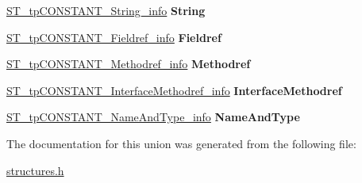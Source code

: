 \begin{DoxyCompactItemize}
\mbox{\label{unionST__tpConstantPool_a624d49bd6a5a4e803ecc39fba2f634e0}} 
\mbox{\hyperlink{structCONSTANT__String__info}{S\+T\+\_\+tp\+C\+O\+N\+S\+T\+A\+N\+T\+\_\+\+String\+\_\+info}} {\bfseries String}
\item 
\mbox{\label{unionST__tpConstantPool_aafaefb9772a16b34e42e568bdef7287a}} 
\mbox{\hyperlink{structST__tpCONSTANT__Fieldref__info}{S\+T\+\_\+tp\+C\+O\+N\+S\+T\+A\+N\+T\+\_\+\+Fieldref\+\_\+info}} {\bfseries Fieldref}
\item 
\mbox{\label{unionST__tpConstantPool_a4947f165e75bad73cc85fb88c49843f8}} 
\mbox{\hyperlink{structST__tpCONSTANT__Methodref__info}{S\+T\+\_\+tp\+C\+O\+N\+S\+T\+A\+N\+T\+\_\+\+Methodref\+\_\+info}} {\bfseries Methodref}
\item 
\mbox{\label{unionST__tpConstantPool_a107de48a81e9582b3f4ba8edc0369117}} 
\mbox{\hyperlink{structST__tpCONSTANT__InterfaceMethodref__info}{S\+T\+\_\+tp\+C\+O\+N\+S\+T\+A\+N\+T\+\_\+\+Interface\+Methodref\+\_\+info}} {\bfseries Interface\+Methodref}
\item 
\mbox{\label{unionST__tpConstantPool_aa58730e0a8d27d4d110307ea6112c2d4}} 
\mbox{\hyperlink{structST__tpCONSTANT__NameAndType__info}{S\+T\+\_\+tp\+C\+O\+N\+S\+T\+A\+N\+T\+\_\+\+Name\+And\+Type\+\_\+info}} {\bfseries Name\+And\+Type}
\end{DoxyCompactItemize}


The documentation for this union was generated from the following file\+:\begin{DoxyCompactItemize}
\item 
\mbox{\hyperlink{structures_8h}{structures.\+h}}\end{DoxyCompactItemize}
